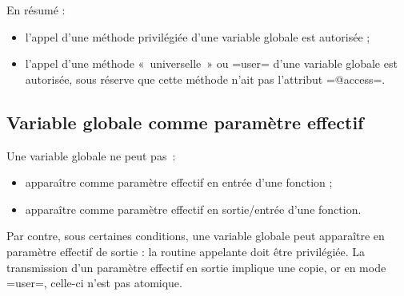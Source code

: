 En résumé :
\begin{itemize}
  \item l'appel d'une méthode privilégiée d'une variable globale est autorisée ;
  \item l'appel d'une méthode «~universelle~» ou \omnibus=user= d'une variable globale est autorisée, sous réserve que cette méthode n'ait pas l'attribut \omnibus=@access=.
\end{itemize}








\subsection{Variable globale comme paramètre effectif}

Une variable globale ne peut pas~:

\begin{itemize}
  \item apparaître comme paramètre effectif en entrée d'une fonction ;
  \item apparaître comme paramètre effectif en sortie/entrée d'une fonction.
\end{itemize}

Par contre, sous certaines conditions, une variable globale peut apparaître en paramètre effectif de sortie : la routine appelante doit être privilégiée. La transmission d'un paramètre effectif en sortie implique une copie, or en mode \omnibus=user=, celle-ci n'est pas atomique.


